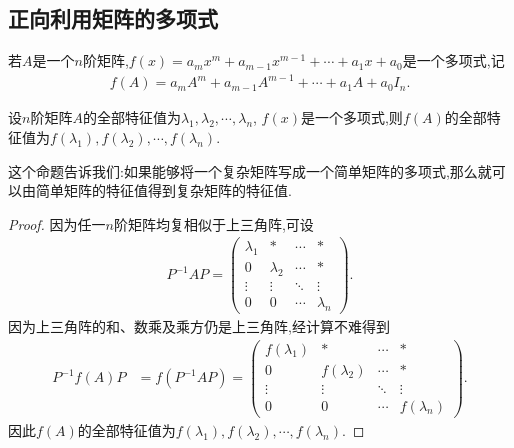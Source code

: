 \documentclass[../../main.tex]{subfiles}%
\begin{document}
\subsection{正向利用矩阵的多项式}

\begin{definition}[矩阵多项式]
若$A$是一个$n$阶矩阵,$f(x) = a_m x^m + a_{m-1} x^{m-1} + \cdots + a_1 x + a_0$是一个多项式,记
\begin{align*}
f(A) = a_m A^m + a_{m-1} A^{m-1} + \cdots + a_1 A + a_0 I_n.
\end{align*}
\end{definition}

\begin{proposition}\label{proposition:矩阵多项式的特征值就是原特征值代入多项式得到的数}
设$n$阶矩阵$A$的全部特征值为$\lambda_1, \lambda_2, \cdots, \lambda_n$, $f(x)$是一个多项式,则$f(A)$的全部特征值为$f(\lambda_1), f(\lambda_2), \cdots, f(\lambda_n)$.
\end{proposition}
\begin{remark}
这个命题告诉我们:如果能够将一个复杂矩阵写成一个简单矩阵的多项式,那么就可以由简单矩阵的特征值得到复杂矩阵的特征值.
\end{remark}
\begin{proof}

因为任一$n$阶矩阵均复相似于上三角阵,可设
\begin{align*}
P^{-1}AP = \begin{pmatrix}
\lambda_1 & * & \cdots & * \\
0 & \lambda_2 & \cdots & * \\
\vdots & \vdots & \ddots & \vdots \\
0 & 0 & \cdots & \lambda_n
\end{pmatrix}.
\end{align*}
因为上三角阵的和、数乘及乘方仍是上三角阵,经计算不难得到
\begin{align*}
P^{-1}f(A)P &= f(P^{-1}AP) = \begin{pmatrix}
f(\lambda_1) & * & \cdots & * \\
0 & f(\lambda_2) & \cdots & * \\
\vdots & \vdots & \ddots & \vdots \\
0 & 0 & \cdots & f(\lambda_n)
\end{pmatrix}.
\end{align*}
因此$f(A)$的全部特征值为$f(\lambda_1), f(\lambda_2), \cdots, f(\lambda_n)$.

\end{proof}
\end{document}
